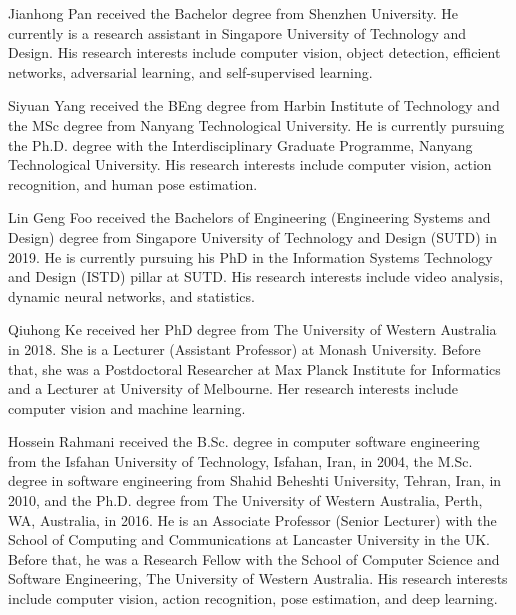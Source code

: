 \documentclass[lettersize,journal]{IEEEtran}
\begin{document}


\begin{IEEEbiography}{Jianhong Pan} received the Bachelor degree from Shenzhen University. He currently is a research assistant in Singapore University of Technology and Design. His research interests include computer vision, object detection, efficient networks, adversarial learning, and self-supervised learning.
\end{IEEEbiography}


\begin{IEEEbiography}{Siyuan Yang} received the BEng degree from Harbin Institute of Technology and the MSc degree from Nanyang Technological University. He is currently pursuing the Ph.D. degree with the Interdisciplinary Graduate Programme, Nanyang Technological University. His research interests include computer vision, action recognition, and human pose estimation.  
\end{IEEEbiography}

\begin{IEEEbiography}{Lin Geng Foo}
received the Bachelors of Engineering (Engineering Systems and Design) degree from Singapore University of Technology and Design (SUTD) in 2019. He is currently pursuing his PhD in the Information Systems Technology and Design (ISTD) pillar at SUTD. His research interests include video analysis, dynamic neural networks, and statistics.
\end{IEEEbiography}

\begin{IEEEbiography}{Qiuhong Ke}  received her PhD degree from The University of Western Australia in 2018. She is a Lecturer (Assistant Professor) at Monash University. Before that, she was a Postdoctoral Researcher at Max Planck Institute for Informatics and a Lecturer at University of Melbourne. Her research interests include computer vision and machine learning.
\end{IEEEbiography}

\begin{IEEEbiography}{Hossein Rahmani} received the B.Sc. degree in computer software engineering from the Isfahan University of Technology, Isfahan, Iran, in 2004, the M.Sc.
degree in software engineering from Shahid Beheshti
University, Tehran, Iran, in 2010, and the Ph.D.
degree from The University of Western Australia,
Perth, WA, Australia, in 2016. He is an Associate Professor (Senior Lecturer) with the School of Computing and Communications at Lancaster University in the UK. Before that, he was a Research
Fellow with the School of Computer Science and
Software Engineering, The University of Western Australia. His research interests include computer vision, action recognition, pose estimation, and deep learning.  
\end{IEEEbiography}
\end{document}
